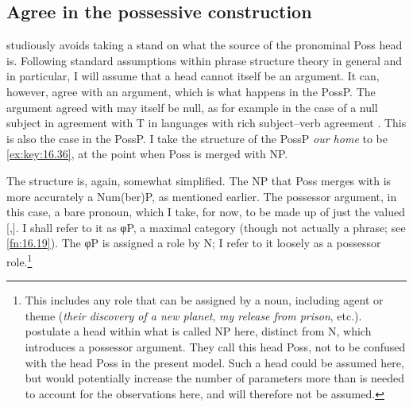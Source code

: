 \documentclass[output=paper]{langsci/langscibook}
\begin{document}
\subsection{Agree in the possessive construction}\label{sec:key:16.3.3}

\citet{Delsing1998} studiously avoids taking a stand on what the source of the
pronominal Poss head is. Following standard assumptions within phrase structure
theory in general and \citet{Roberts2010} in particular, I will assume that a
head cannot itself be an argument. It can, however, agree with an argument,
which is what happens in the PossP. The argument agreed with may itself be
null, as for example in the case of a null subject in agreement with T in
languages with rich subject--verb agreement
\citep[\emph{passim}]{BibHolRobShee2010}.  This is also the case in the PossP.
I take the structure of the PossP \emph{our home} to be \eqref{ex:key:16.36},
at the point when Poss is merged with NP.

\ea\label{ex:key:16.36}
\z

The structure is, again, somewhat simplified. The NP that Poss merges with is
more accurately a Num(ber)P, as mentioned earlier. The possessor argument, in
this case, a bare pronoun, which I take, for now, to be made up of just the
valued  [\First,\Pl{}]. I shall refer to it as φP, a maximal category
(though not actually a phrase; see \cref{fn:16.19}). The φP is assigned a role by N; I
refer to it loosely as a possessor role.\footnote{This includes any role that
    can be assigned by a noun, including agent or theme (\emph{their discovery
    of a new planet}, \emph{my release from prison}, etc.).
    \citet{AleHaeSta2007} postulate a head within what is called NP here,
    distinct from N, which introduces a possessor argument. They call this head
    Poss, not to be confused with the head Poss in the present model. Such a
    head could be assumed here, but would potentially increase the number of
parameters more than is needed to account for the observations here, and will
therefore not be assumed.\label{fn:16.18}}
\end{document}
